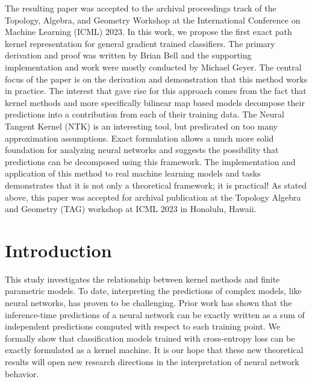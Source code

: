 The resulting paper was accepted to the
archival proceedings track of the Topology, Algebra, and Geometry
Workshop at the International Conference on Machine Learning (ICML)
2023. In this work, we propose the first exact path kernel
representation for general gradient trained classifiers. The primary
derivation and proof was written by Brian Bell and the supporting
implementation and work were mostly conducted by Michael Geyer. The
central focus of the paper is on the derivation and demonstration that
this method works in practice. The interest that gave rise for this
approach comes from the fact that kernel methods and more specifically
bilinear map based models decompose their predictions into a
contribution from each of their training data. The Neural Tangent
Kernel (NTK) is an interesting tool, but predicated on too many
approximation assumptions. Exact formulation allows a much more
solid foundation for analyzing neural networks and suggests the
possibility that predictions can be decomposed using this
framework. The implementation and application of this method to real
machine learning models and tasks demonstrates that it is not only a
theoretical framework; it is practical! As stated above, this paper
was accepted for archival publication at the Topology Algebra and
Geometry (TAG) workshop at ICML 2023 in Honolulu, Hawaii.

\section{Introduction}

This study investigates the relationship between kernel methods and finite parametric models. To date, interpreting the predictions of complex models, like neural networks, has proven to be challenging. Prior work has shown that the inference-time predictions of a neural network can be exactly written as a sum of independent predictions computed with respect to each training point. We formally show that classification models trained with cross-entropy loss can be exactly formulated as a kernel machine. It is our hope that these new theoretical results will open new research directions in the interpretation of neural network behavior.






